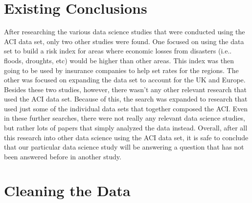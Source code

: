 \documentclass[12pt]{report}
\begin{document}
\newpage	
\section* {Existing Conclusions} 
		
\indent	\par After researching the various data science studies that were conducted using the ACI data set, only two other studies were found. One focused on using the data set to build a risk index for areas where economic losses from disasters (i.e.. floods, droughts, etc) would be higher than other areas. This index was then going to be used by insurance companies to help set rates for the regions. The other was focused on expanding the data set to account for the UK and Europe. Besides these two studies, however, there wasn't any other relevant research that used the ACI data set. Because of this, the search was expanded to research that used just some of the individual data sets that together composed the ACI. Even in these further searches, there were not really any relevant data science studies, but rather lots of papers that simply analyzed the data instead. Overall, after all this research into other data science using the ACI data set, it is safe to conclude that our particular data science study will be answering a question that has not been answered before in another study.
		
\section* {Cleaning the Data} 
\end{document}
